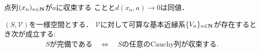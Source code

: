 	\begin{screen}
		\begin{thm}[点列の擬距離に関する収束]
			点列$(x_n)_{n \in \mathbf{N}}$が$a$に収束する
			ことと$d(x_n,a) \longrightarrow 0$は同値．
		\end{thm}
	\end{screen}
	
	\begin{screen}
		\begin{thm}
		\label{thm:complete_iff_every_Cauchy_seq_converges_if_entourage_contains_some_countable_subset}
			$(S,\mathscr{V})$を一様空間とする．
			$\mathscr{V}$に対して可算な基本近縁系$\{V_n\}_{n \in \mathbf{N}}$が存在するとき次が成立する:
			\begin{align}
				\mbox{$S$が完備である} \quad \Longleftrightarrow \quad
				\mbox{$S$の任意のCauchy列が収束する}.
			\end{align}
		\end{thm}
	\end{screen}
	
